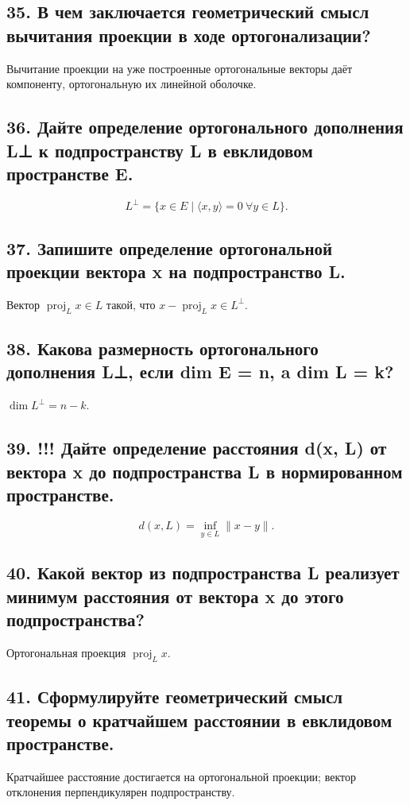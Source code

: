 \documentclass[a4paper,12pt]{article}
\newcommand{\proj}{\operatorname{proj}}
\begin{document}
\subsection*{35. В чем заключается геометрический смысл вычитания проекции в ходе ортогонализации?}
Вычитание проекции на уже построенные ортогональные векторы даёт компоненту, ортогональную их линейной оболочке.

\subsection*{36. Дайте определение ортогонального дополнения L⊥ к подпространству L в евклидовом пространстве E.}
\[ L^\perp = \{ x \in E \mid \langle x, y \rangle = 0 \ \forall y \in L \}. \]

\subsection*{37. Запишите определение ортогональной проекции вектора x на подпространство L.}
Вектор \( \proj_L x \in L\) такой, что \(x - \proj_L x \in L^\perp\).

\subsection*{38. Какова размерность ортогонального дополнения L⊥, если dim E = n, a dim L = k?}
\(\dim L^\perp = n - k\).

\subsection*{39. !!! Дайте определение расстояния d(x, L) от вектора x до подпространства L в нормированном пространстве.}
\[ d(x, L) = \inf_{y \in L} \|x - y\|. \]

\subsection*{40. Какой вектор из подпространства L реализует минимум расстояния от вектора x до этого подпространства?}
Ортогональная проекция \( \proj_L x \).

\subsection*{41. Сформулируйте геометрический смысл теоремы о кратчайшем расстоянии в евклидовом пространстве.}
Кратчайшее расстояние достигается на ортогональной проекции; вектор отклонения перпендикулярен подпространству.
\end{document}
